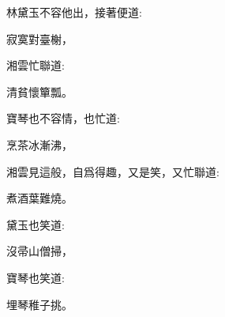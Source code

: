 \begin{parag}
    林黛玉不容他出，接著便道:
\end{parag}


\begin{poem}
    \begin{pl} 寂寞對臺榭，\end{pl}
\end{poem}


\begin{parag}
    湘雲忙聯道:
\end{parag}


\begin{poem}
    \begin{pl} 清貧懷簞瓢。\end{pl}
\end{poem}


\begin{parag}
    寶琴也不容情，也忙道:
\end{parag}


\begin{poem}
    \begin{pl} 烹茶冰漸沸，\end{pl}
\end{poem}


\begin{parag}
    湘雲見這般，自爲得趣，又是笑，又忙聯道:
\end{parag}


\begin{poem}
    \begin{pl} 煮酒葉難燒。\end{pl}
\end{poem}


\begin{parag}
    黛玉也笑道:
\end{parag}


\begin{poem}
    \begin{pl} 沒帚山僧掃，\end{pl}
\end{poem}


\begin{parag}
    寶琴也笑道:
\end{parag}


\begin{poem}
    \begin{pl} 埋琴稚子挑。\end{pl}
\end{poem}


